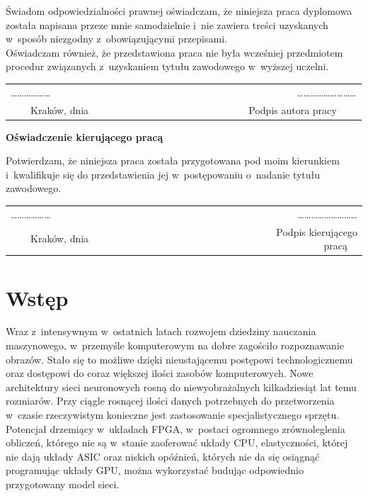 \documentclass[12pt, oneside, a4paper]{article}
\begin{document}
\noindent Świadom odpowiedzialności prawnej oświadczam, że niniejsza praca
dyplomowa została napisana przeze mnie samodzielnie i~nie zawiera treści
uzyskanych w~sposób niezgodny z~obowiązującymi przepisami.\\

\noindent Oświadczam również, że przedstawiona praca nie była wcześniej
przedmiotem procedur związanych z~uzyskaniem
tytułu zawodowego w~wyższej uczelni.
\vspace{2cm}
\begin{center}
\begin{tabular}{lr}
\ldots\ldots\ldots\ldots\ldots\ldots~~~~~~~~~~~~~~~~~~~~~~~~~~~~~~~~~~~~~~&
\ldots\ldots\ldots\ldots\ldots\ldots\ldots\ldots\ldots \\
{~~~~Kraków, dnia} & {Podpis autora pracy~~~~}
\end{tabular}
\end{center}
\vspace{5cm}
\begin{flushleft}
\large \textbf{Oświadczenie kierującego pracą}
\end{flushleft}

\noindent Potwierdzam, że niniejsza praca została przygotowana pod moim
kierunkiem i~kwalifikuje się do przedstawienia jej w~postępowaniu
o~nadanie tytułu zawodowego.
\vspace{2cm}
\begin{center}
\begin{tabular}{lr}
\ldots\ldots\ldots\ldots\ldots\ldots~~~~~~~~~~~~~~~~~~~~~~~~~~~~~~~~~~~~~~&
\ldots\ldots\ldots\ldots\ldots\ldots\ldots\ldots\ldots \\
{~~~~Kraków, dnia} & {Podpis kierującego pracą~~}
\end{tabular}
\end{center}
\vfill

\newpage
\tableofcontents

\newpage
\section*{Wstęp}
%
Wraz z~intensywnym w~ostatnich latach rozwojem dziedziny nauczania maszynowego,
w~przemyśle komputerowym na dobre zagościło rozpoznawanie obrazów. Stało
się to możliwe dzięki nieustającemu postępowi technologicznemu oraz
dostępowi do coraz większej ilości zasobów komputerowych. Nowe architektury
sieci neuronowych rosną do niewyobrażalnych kilkadziesiąt lat temu rozmiarów.
Przy ciągle rosnącej ilości danych potrzebnych do przetworzenia w~czasie
rzeczywistym konieczne jest zastosowanie specjalistycznego sprzętu.
Potencjał drzemiący w~układach FPGA, w~postaci
ogromnego zrównoleglenia obliczeń, którego nie są w~stanie zaoferować układy CPU,
elastyczności, której nie dają układy ASIC oraz
niskich opóźnień, których nie da się osiągnąć programując układy GPU,
można wykorzystać budując odpowiednio przygotowany model sieci.
\end{document}
